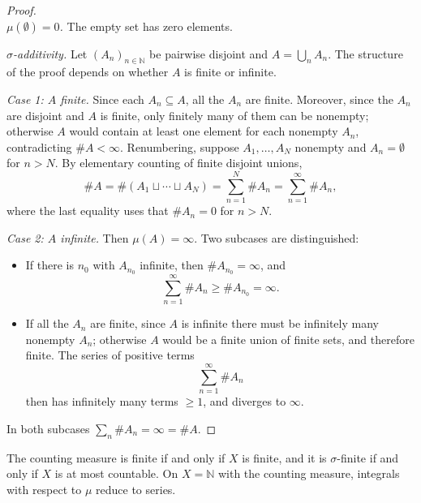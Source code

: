 \documentclass[11pt, a4paper]{article}
\begin{document}
\begin{proof}\leavevmode\\
\textit{$\mu(\emptyset) = 0$.} The empty set has zero elements.

\textit{$\sigma$-additivity.} Let $(A_n)_{n \in \mathbb{N}}$ be pairwise disjoint and
$A = \bigcup_n A_n$. The structure of the proof depends on whether $A$ is finite or infinite.

\textit{Case 1: $A$ finite.} Since each $A_n \subseteq A$, all the $A_n$ are finite. Moreover,
since the $A_n$ are disjoint and $A$ is finite, only finitely many of them can be
nonempty; otherwise $A$ would contain at least one element for each nonempty $A_n$,
contradicting $\#A < \infty$. Renumbering, suppose $A_1, \dots, A_N$ nonempty and $A_n =
\emptyset$ for $n > N$. By elementary counting of finite disjoint unions,
$$ \#A = \#(A_1 \sqcup \cdots \sqcup A_N) = \sum_{n=1}^{N} \#A_n = \sum_{n=1}^{\infty} \#A_n, $$
where the last equality uses that $\#A_n = 0$ for $n > N$.

\textit{Case 2: $A$ infinite.} Then $\mu(A) = \infty$. Two subcases are distinguished:
\begin{itemize}
    \item If there is $n_0$ with $A_{n_0}$ infinite, then $\#A_{n_0} = \infty$, and
    $$ \sum_{n=1}^{\infty} \#A_n \ge \#A_{n_0} = \infty. $$
    \item If all the $A_n$ are finite, since $A$ is infinite there must be infinitely many nonempty
    $A_n$; otherwise $A$ would be a finite union of finite sets, and therefore finite. The series
    of positive terms
    $$ \sum_{n=1}^{\infty} \#A_n $$
    then has infinitely many terms $\ge 1$, and diverges to $\infty$.
\end{itemize}
In both subcases $\sum_n \#A_n = \infty = \#A$.
\end{proof}

\obs The counting measure is finite if and only if $X$ is finite, and it is $\sigma$-finite if and only if
$X$ is at most countable. On $X = \mathbb{N}$ with the counting measure, integrals
with respect to $\mu$ reduce to series.
\end{document}
